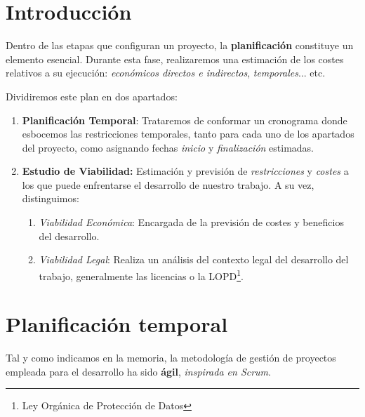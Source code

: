 
\section{Introducción}

Dentro de las etapas que configuran un proyecto, la \textbf{planificación} constituye un elemento esencial. Durante esta fase, realizaremos una estimación de los costes relativos a su ejecución: \textit{económicos directos e indirectos}, \textit{temporales}... etc.

Dividiremos este plan en dos apartados:
\begin{enumerate}
    \item \textbf{Planificación Temporal}: Trataremos de conformar un cronograma donde esbocemos las restricciones temporales, tanto para cada uno de los apartados del proyecto, como asignando fechas \textit{inicio} y \textit{finalización} estimadas.

    \item \textbf{Estudio de Viabilidad:} Estimación y previsión de \textit{restricciones} y \textit{costes} a los que puede enfrentarse el desarrollo de nuestro trabajo. A su vez, distinguimos:
\begin{enumerate}
        \item \textit{Viabilidad Económica}: Encargada de la previsión de costes y beneficios del desarrollo.

        \item \textit{Viabilidad Legal}: Realiza un análisis del contexto legal del desarrollo del trabajo, generalmente las licencias o la LOPD\footnote{Ley Orgánica de Protección de Datos}.
    \end{enumerate}
\end{enumerate}

\section{Planificación temporal}

Tal y como indicamos en la memoria, la metodología de gestión de proyectos empleada para el desarrollo ha sido \textbf{ágil}, \textit{inspirada en Scrum}\cite{SaezHurtado2021ComoUtilizarla}.


